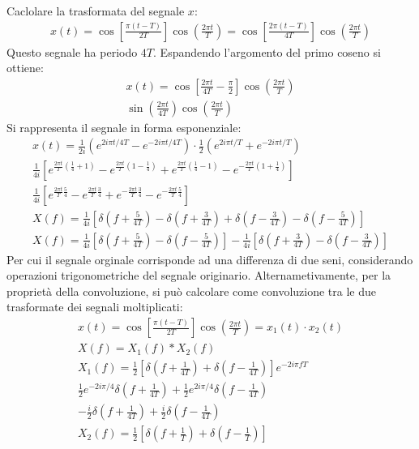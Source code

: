 \documentclass{article}
\numberwithin{equation}{subsection}
\begin{document}
Caclolare la trasformata del segnale $x$:
\begin{gather*}
    x(t)=\cos\left[\displaystyle\frac{\pi(t-T)}{2T}\right]\cos\left(\frac{2\pi t}{T}\right)=\cos\left[\displaystyle\frac{2\pi(t-T)}{4T}\right]\cos\left(\frac{2\pi t}{T}\right)
\end{gather*}
Questo segnale ha periodo $4T$. Espandendo l'argomento del primo coseno si ottiene:
\begin{gather*}
    x(t)=\displaystyle\cos\left[\frac{2\pi t}{4T}-\frac{\pi}{2}\right]\cos\left(\frac{2\pi t}{T}\right)\\
    \sin\left(\displaystyle\frac{2\pi t}{4T}\right)\cos\left(\frac{2\pi t}{T}\right)
\end{gather*}
Si rappresenta il segnale in forma esponenziale:
\begin{gather*}
    x(t)=\displaystyle\frac{1}{2i}\left(e^{2i\pi t/4T}-e^{-2i\pi t/4T}\right)\cdot\displaystyle\frac{1}{2}\left(e^{2i\pi t/T}+e^{-2i\pi t/T}\right)\\
    \displaystyle\frac{1}{4i}\left[e^{\frac{2\pi t}{T}\left(\frac{1}{4}+1\right)}-e^{\frac{2\pi t}{T}\left(1-\frac{1}{4}\right)}+e^{\frac{2\pi t}{T}\left(\frac{1}{4}-1\right)}-e^{-\frac{2\pi t}{T}\left(1+\frac{1}{4}\right)}\right]\\
    \displaystyle\frac{1}{4i}\left[e^{\frac{2\pi t}{T}\frac{5}{4}}-e^{\frac{2\pi t}{T}\frac{3}{4}}+e^{-\frac{2\pi t}{T}\frac{3}{4}}-e^{-\frac{2\pi t}{T}\frac{5}{4}}\right]\\
    X(f)=\displaystyle\frac{1}{4i}\left[\delta\left(f+\frac{5}{4T}\right)-\delta\left(f+\frac{3}{4T}\right)+\delta\left(f-\frac{3}{4T}\right)-\delta\left(f-\frac{5}{4T}\right)\right]\\
    X(f)=\displaystyle\frac{1}{4i}\left[\delta\left(f+\frac{5}{4T}\right)-\delta\left(f-\frac{5}{4T}\right)\right]-\frac{1}{4i}\left[\delta\left(f+\frac{3}{4T}\right)-\delta\left(f-\frac{3}{4T}\right)\right]
\end{gather*}
Per cui il segnale orginale corrisponde ad una differenza di due seni, considerando operazioni trigonometriche del segnale originario. Alternametivamente, per la 
proprietà della convoluzione, si può calcolare come convoluzione tra le due trasformate dei segnali moltiplicati:
\begin{gather*}
    x(t)=\cos\left[\displaystyle\frac{\pi(t-T)}{2T}\right]\cos\left(\frac{2\pi t}{T}\right)=x_1(t)\cdot x_2(t)\\
    X(f)=X_1(f)*X_2(f)\\
    X_1(f)=\displaystyle\frac{1}{2}\left[\delta\left(f+\frac{1}{4T}\right)+\delta\left(f-\frac{1}{4T}\right)\right]e^{-2i\pi fT}\\
    \displaystyle\frac{1}{2}e^{-2i\pi/4}\delta\left(f+\frac{1}{4T}\right)+\frac{1}{2}e^{2i\pi /4}\delta\left(f-\frac{1}{4T}\right)\\
    \displaystyle-\frac{i}{2}\delta\left(f+\frac{1}{4T}\right)+\frac{i}{2}\delta\left(f-\frac{1}{4T}\right)\\
    X_2(f)=\displaystyle\frac{1}{2}\left[\delta\left(f+\frac{1}{T}\right)+\delta\left(f-\frac{1}{T}\right)\right]
\end{gather*}
\end{document}
